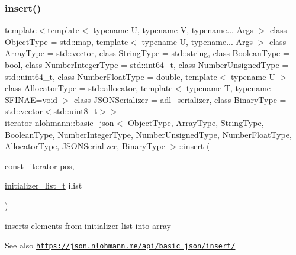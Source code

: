 \subsubsection{\texorpdfstring{insert()}{insert()}\hspace{0.1cm}{\footnotesize\ttfamily [5/6]}}
{\footnotesize\ttfamily template$<$template$<$ typename U, typename V, typename... Args $>$ class Object\+Type = std\+::map, template$<$ typename U, typename... Args $>$ class Array\+Type = std\+::vector, class String\+Type  = std\+::string, class Boolean\+Type  = bool, class Number\+Integer\+Type  = std\+::int64\+\_\+t, class Number\+Unsigned\+Type  = std\+::uint64\+\_\+t, class Number\+Float\+Type  = double, template$<$ typename U $>$ class Allocator\+Type = std\+::allocator, template$<$ typename T, typename S\+F\+I\+N\+A\+E=void $>$ class J\+S\+O\+N\+Serializer = adl\+\_\+serializer, class Binary\+Type  = std\+::vector$<$std\+::uint8\+\_\+t$>$$>$ \\
\hyperlink{classnlohmann_1_1basic__json_aa549b2b382916b3baafb526e5cb410bd}{iterator} \hyperlink{classnlohmann_1_1basic__json}{nlohmann\+::basic\+\_\+json}$<$ Object\+Type, Array\+Type, String\+Type, Boolean\+Type, Number\+Integer\+Type, Number\+Unsigned\+Type, Number\+Float\+Type, Allocator\+Type, J\+S\+O\+N\+Serializer, Binary\+Type $>$\+::insert (\begin{DoxyParamCaption}\item[{\hyperlink{classnlohmann_1_1basic__json_aebd2cfa7e4ded4e97cde9269bfeeea38}{const\+\_\+iterator}}]{pos,  }\item[{\hyperlink{classnlohmann_1_1basic__json_ac569f292a070dfd2f6b69c16e746095a}{initializer\+\_\+list\+\_\+t}}]{ilist }\end{DoxyParamCaption})\hspace{0.3cm}{\ttfamily [inline]}}



inserts elements from initializer list into array 

\begin{DoxySeeAlso}{See also}
\href{https://json.nlohmann.me/api/basic_json/insert/}{\tt https\+://json.\+nlohmann.\+me/api/basic\+\_\+json/insert/} 
\end{DoxySeeAlso}
\mbox{\label{classnlohmann_1_1basic__json_a0181d03c6314bedcbad2e92d3676223c}} 
